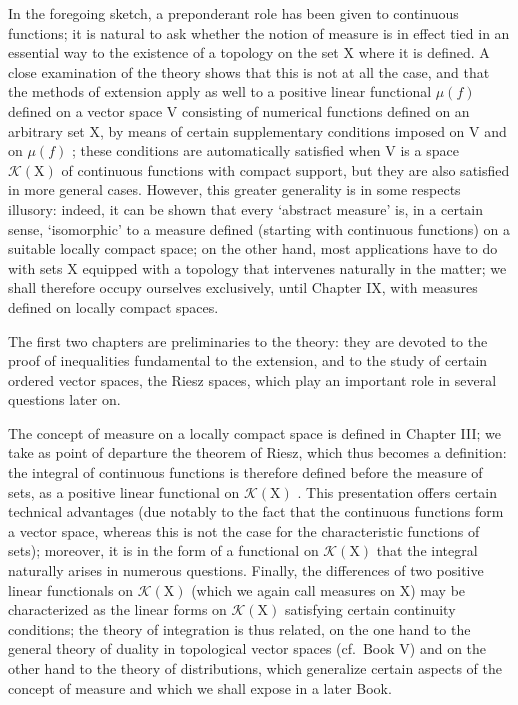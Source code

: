 In the foregoing sketch, a preponderant role has been given to continuous functions; it is natural to ask whether the notion of measure is in effect tied in an essential way to the existence of a topology on the set X where it is defined. A close examination of the theory shows that this is not at all the case, and that the methods of extension apply as well to a positive linear functional \(\mu(f)\) defined on a vector space V consisting of numerical functions defined on an arbitrary set X, by means of certain supplementary conditions imposed on V and on \(\mu(f)\) ; these conditions are automatically satisfied when V is a space \(\mathcal{K}(\mathrm{X})\) of continuous functions with compact support, but they are also satisfied in more general cases. However, this greater generality is in some respects illusory: indeed, it can be shown that every `abstract measure' is, in a certain sense, `isomorphic' to a measure defined (starting with continuous functions) on a suitable locally compact space; on the other hand, most applications have to do with sets X equipped with a topology that intervenes naturally in the matter; we shall therefore occupy ourselves exclusively, until Chapter IX, with measures defined on locally compact spaces.

The first two chapters are preliminaries to the theory: they are devoted to the proof of inequalities fundamental to the extension, and to the study of certain ordered vector spaces, the Riesz spaces, which play an important role in several questions later on.

The concept of measure on a locally compact space is defined in Chapter III; we take as point of departure the theorem of Riesz, which thus becomes a definition: the integral of continuous functions is therefore defined before the measure of sets, as a positive linear functional on \(\mathcal{K}(\mathrm{X})\) . This presentation offers certain technical advantages (due notably to the fact that the continuous functions form a vector space, whereas this is not the case for the characteristic functions of sets); moreover, it is in the form of a functional on \(\mathcal{K}(\mathrm{X})\) that the integral naturally arises in numerous questions. Finally, the differences of two positive linear functionals on \(\mathcal{K}(\mathrm{X})\) (which we again call measures on X) may be characterized as the linear forms on \(\mathcal{K}(\mathrm{X})\) satisfying certain continuity conditions; the theory of integration is thus related, on the one hand to the general theory of duality in topological vector spaces (cf.~Book V) and on the other hand to the theory of distributions, which generalize certain aspects of the concept of measure and which we shall expose in a later Book.

